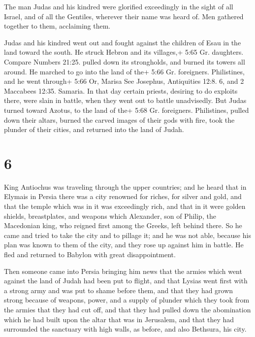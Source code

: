  The man Judas and his kindred were glorified exceedingly
in the sight of all Israel, and of all the Gentiles, wherever their name
was heard of.  Men gathered together to them, acclaiming
them.

 Judas and his kindred went out and fought against the
children of Esau in the land toward the south. He struck Hebron and its
villages,+ 5:65 Gr. daughters. Compare Numbers 21:25. pulled down its
strongholds, and burned its towers all around.  He marched
to go into the land of the+ 5:66 Gr. foreigners. Philistines, and he
went through+ 5:66 Or, Marisa See Josephus, Antiquities 12:8. 6, and 2
Maccabees 12:35. Samaria.  In that day certain priests,
desiring to do exploits there, were slain in battle, when they went out
to battle unadvisedly.  But Judas turned toward Azotus, to
the land of the+ 5:68 Gr. foreigners. Philistines, pulled down their
altars, burned the carved images of their gods with fire, took the
plunder of their cities, and returned into the land of Judah.

\hypertarget{section-5}{%
\section{6}\label{section-5}}

 King Antiochus was traveling through the upper countries;
and he heard that in Elymais in Persia there was a city renowned for
riches, for silver and gold,  and that the temple which was
in it was exceedingly rich, and that in it were golden shields,
breastplates, and weapons which Alexander, son of Philip, the Macedonian
king, who reigned first among the Greeks, left behind there.
 So he came and tried to take the city and to pillage it;
and he was not able, because his plan was known to them of the city,
 and they rose up against him in battle. He fled and
returned to Babylon with great disappointment.

 Then someone came into Persia bringing him news that the
armies which went against the land of Judah had been put to flight,
 and that Lysias went first with a strong army and was put
to shame before them, and that they had grown strong because of weapons,
power, and a supply of plunder which they took from the armies that they
had cut off,  and that they had pulled down the abomination
which he had built upon the altar that was in Jerusalem, and that they
had surrounded the sanctuary with high walls, as before, and also
Bethsura, his city.

